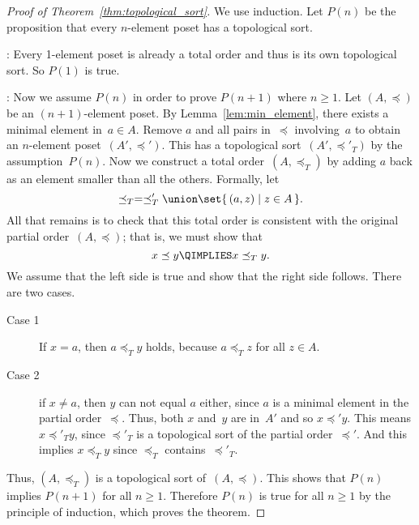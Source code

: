 \begin{proof}[Proof of Theorem~\ref{thm:topological_sort}]
We use induction.  Let $P(n)$ be the proposition that every
$n$-element poset has a topological sort.

: Every 1-element poset is already a total
order and thus is its own topological sort.  So $P(1)$ is true.

: Now we assume $P(n)$ in order to prove
$P(n + 1)$ where $n \ge 1$.  Let $(A, \preceq)$ be an $(n +
1)$-element poset.  By Lemma~\ref{lem:min_element}, there exists a
minimal element in~$a \in A$.  Remove $a$ and all pairs in~$\preceq$
involving~$a$ to obtain an $n$-element poset~$(A', \preceq')$.  This
has a topological sort~$(A', \preceq'_T)$ by the assumption~$P(n)$.
Now we construct a total order~$(A, \preceq_T)$ by adding $a$ back as
an element smaller than all the others.  Formally, let
\begin{equation*}
    \preceq_T = \preceq'_T \union \set{\, (a, z) \mid z \in A \,}.
\end{equation*}
All that remains is to check that this total order is consistent with
the original partial order~$(A, \preceq)$; that is, we must show that
\begin{equation*}
    x \preceq y \QIMPLIES x \preceq_T y.
\end{equation*}
We assume that the left side is true and show that the right side
follows.  There are two cases.
\begin{description}

\item[Case 1]

If $x = a$, then $a \preceq_T y$ holds, because $a \preceq_T z$ for
all $z \in A$.

\item[Case 2]

if $x \ne a$, then $y$ can not equal $a$ either, since $a$ is a
minimal element in the partial order~$\preceq$.  Thus, both $x$
and~$y$ are in~$A'$ and so $x \preceq' y$.  This means $x \preceq'_T
y$, since $\preceq'_T$ is a topological sort of the partial
order~$\preceq'$.  And this implies $x \preceq_T y$ since $\preceq_T$
contains~$\preceq'_T$.
\end{description}

Thus, $(A, \preceq_T)$ is a topological sort of~$(A, \preceq)$.  This
shows that $P(n)$ implies $P(n + 1)$ for all $n \ge 1$.  Therefore
$P(n)$ is true for all $n \ge 1$ by the principle of induction, which
proves the theorem.
\end{proof}

